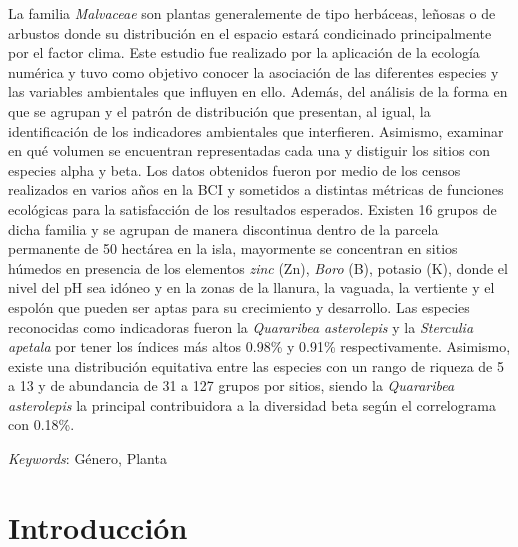 \documentclass[11pt,]{article}
\renewenvironment{abstract}
 {{%
    \setlength{\leftmargin}{0mm}
    \setlength{\rightmargin}{\leftmargin}%
  }%
  \relax}
 {\endlist}
\begin{document}
\begin{abstract}

    \hbox{\vrule height .2pt width 39.14pc}

    \vskip 8.5pt %

\noindent La familia \emph{Malvaceae} son plantas generalemente de tipo herbáceas,
leñosas o de arbustos donde su distribución en el espacio estará
condicinado principalmente por el factor clima. Este estudio fue
realizado por la aplicación de la ecología numérica y tuvo como objetivo
conocer la asociación de las diferentes especies y las variables
ambientales que influyen en ello. Además, del análisis de la forma en
que se agrupan y el patrón de distribución que presentan, al igual, la
identificación de los indicadores ambientales que interfieren. Asimismo,
examinar en qué volumen se encuentran representadas cada una y distiguir
los sitios con especies alpha y beta. Los datos obtenidos fueron por
medio de los censos realizados en varios años en la BCI y sometidos a
distintas métricas de funciones ecológicas para la satisfacción de los
resultados esperados. Existen 16 grupos de dicha familia y se agrupan de
manera discontinua dentro de la parcela permanente de 50 hectárea en la
isla, mayormente se concentran en sitios húmedos en presencia de los
elementos \emph{zinc} (Zn), \emph{Boro} (B), potasio (K), donde el nivel
del pH sea idóneo y en la zonas de la llanura, la vaguada, la vertiente
y el espolón que pueden ser aptas para su crecimiento y desarrollo. Las
especies reconocidas como indicadoras fueron la \emph{Quararibea
asterolepis} y la \emph{Sterculia apetala} por tener los índices más
altos 0.98\% y 0.91\% respectivamente. Asimismo, existe una distribución
equitativa entre las especies con un rango de riqueza de 5 a 13 y de
abundancia de 31 a 127 grupos por sitios, siendo la \emph{Quararibea
asterolepis} la principal contribuidora a la diversidad beta según el
correlograma con 0.18\%.


\vskip 8.5pt \noindent \emph{Keywords}: Género, Planta \par

    \hbox{\vrule height .2pt width 39.14pc}



\end{abstract}


\vskip 6.5pt


\noindent  \section{Introducción}\label{introducciuxf3n}
\end{document}
